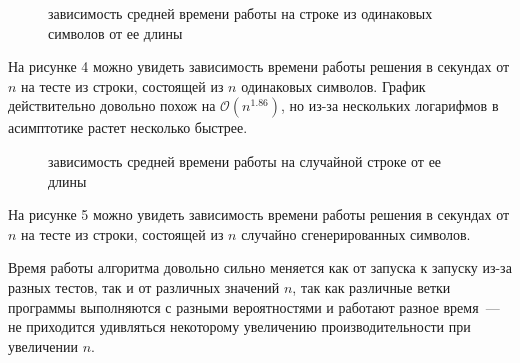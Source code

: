 \begin{figure}[h]
\caption{зависимость средней времени работы на строке из одинаковых символов от ее длины}
\end{figure}

На рисунке 4 можно увидеть зависимость времени работы решения в секундах от $n$ на тесте из строки, состоящей из $n$ одинаковых символов. График действительно довольно похож на $\mathcal{O}(n^{1.86})$, но из-за нескольких логарифмов в асимптотике растет несколько быстрее. 

\begin{figure}[h]
\caption{зависимость средней времени работы на случайной строке от ее длины}
\end{figure}

На рисунке 5 можно увидеть зависимость времени работы решения в секундах от $n$ на тесте из строки, состоящей из $n$ случайно сгенерированных символов.

Время работы алгоритма довольно сильно меняется как от запуска к запуску из-за разных тестов, так и от различных значений $n$, так как различные ветки программы выполняются с разными вероятностями и работают разное время~--- не приходится удивляться некоторому увеличению производительности при увеличении $n$.
